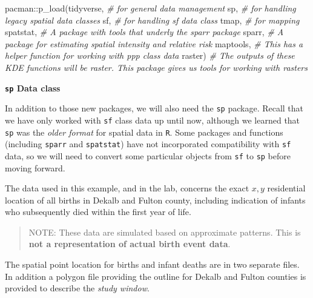 \documentclass[
]{book}
\newenvironment{Shaded}{\begin{snugshade}}{\end{snugshade}}
\newcommand{\CommentTok}[1]{\textcolor[rgb]{0.56,0.35,0.01}{\textit{#1}}}
\newcommand{\FunctionTok}[1]{\textcolor[rgb]{0.00,0.00,0.00}{#1}}
\newcommand{\NormalTok}[1]{#1}
\newcommand{\SpecialCharTok}[1]{\textcolor[rgb]{0.00,0.00,0.00}{#1}}
\newenvironment{rmdnote}[1]
  {
  \begin{itemize}
  \renewcommand{\labelitemi}{
    \raisebox{-.7\height}[0pt][0pt]{
      {\setkeys{Gin}{width=3em,keepaspectratio}\texttt{[image: images/\#1]}}
    }
  }
  \setlength{\fboxsep}{1em}
  \begin{note}
  \item
  }
  {
  \end{note}
  \end{itemize}
  }
\begin{document}
\begin{Shaded}
\begin{Highlighting}[]
\NormalTok{pacman}\SpecialCharTok{::}\FunctionTok{p\_load}\NormalTok{(tidyverse,  }\CommentTok{\# for general data management}
\NormalTok{               sp,         }\CommentTok{\# for handling legacy spatial data classes}
\NormalTok{               sf,         }\CommentTok{\# for handling sf data class}
\NormalTok{               tmap,       }\CommentTok{\# for mapping}
\NormalTok{               spatstat,   }\CommentTok{\# A package with tools that underly the sparr package}
\NormalTok{               sparr,      }\CommentTok{\# A package for estimating spatial intensity and relative risk}
\NormalTok{               maptools,   }\CommentTok{\# This has a helper function for working with ppp class data}
\NormalTok{               raster)     }\CommentTok{\# The outputs of these KDE functions will be raster. This package gives us tools for working with rasters}
\end{Highlighting}
\end{Shaded}

\begin{rmdnote}{note}
\textbf{\texttt{sp} Data class}

In addition to those new packages, we will also need the \texttt{sp} package. Recall that we have only worked with \texttt{sf} class data up until now, although we learned that \texttt{sp} was the \emph{older format} for spatial data in \texttt{R}. Some packages and functions (including \texttt{sparr} and \texttt{spatstat}) have not incorporated compatibility with \texttt{sf} data, so we will need to convert some particular objects from \texttt{sf} to \texttt{sp} before moving forward.

\end{rmdnote}

The data used in this example, and in the lab, concerns the exact \(x,y\) residential location of all births in Dekalb and Fulton county, including indication of infants who subsequently died within the first year of life.

\begin{quote}
NOTE: These data are simulated based on approximate patterns. This is \textbf{not a representation of actual birth event data}.
\end{quote}

The spatial point location for births and infant deaths are in two separate files. In addition a polygon file providing the outline for Dekalb and Fulton counties is provided to describe the \emph{study window}.
\end{document}
